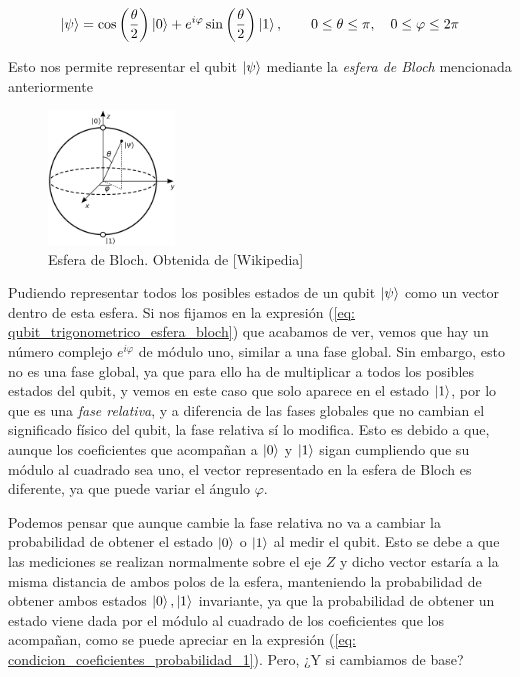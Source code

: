 \documentclass[12pt]{article}
\numberwithin{equation}{section} %
\begin{document}
    \begin{equation}
        \ket{\psi} = \cos \left( \frac{\theta}{2} \right) \ket{0} + e^{i \varphi} \sin \left( \frac{\theta}{2} \right) \ket{1}, \qquad 0 \leq \theta \leq \pi, \quad 0 \leq \varphi \leq 2 \pi
        \label{eq: qubit_trigonometrico_esfera_bloch}
    \end{equation}

    \vspace{2.5mm}

    Esto nos permite representar el qubit \( \ket{\psi} \) mediante la \textit{esfera de Bloch} mencionada anteriormente

    \begin{figure}[H]
        \centering
        \includegraphics[width=0.3\textwidth]{img/Bloch/bloch_sphere.png}
        \caption{Esfera de Bloch. Obtenida de [Wikipedia]}\label{fig: bloch_sphere}
    \end{figure}

    Pudiendo representar todos los posibles estados de un qubit \( \ket{\psi} \) como un vector dentro de esta esfera. 
    Si nos fijamos en la expresión (\ref{eq: qubit_trigonometrico_esfera_bloch}) que acabamos de ver, vemos que hay un número complejo \( e^{i \varphi} \) de módulo uno, similar a una fase global. Sin embargo, esto no es una fase global, ya que para ello ha de multiplicar a todos los posibles estados del qubit, y vemos en este caso que solo aparece en el estado \( \ket{1} \), por lo que es una \textit{fase relativa}, y a diferencia de las fases globales que no cambian el significado físico del qubit, la fase relativa sí lo modifica. Esto es debido a que, aunque los coeficientes que acompañan a \( \ket{0} \) y \( \ket{1} \) sigan cumpliendo que su módulo al cuadrado sea uno, el vector representado en la esfera de Bloch es diferente, ya que puede variar el ángulo \( \varphi \).

    \vspace{5mm}

    Podemos pensar que aunque cambie la fase relativa no va a cambiar la probabilidad de obtener el estado \( \ket{0} \) o \( \ket{1} \) al medir el qubit. Esto se debe a que las mediciones se realizan normalmente sobre el eje \( Z \) y dicho vector estaría a la misma distancia de ambos polos de la esfera, manteniendo la probabilidad de obtener ambos estados \( \ket{0}, \ket{1} \) invariante, ya que la probabilidad de obtener un estado viene dada por el módulo al cuadrado de los coeficientes que los acompañan, como se puede apreciar en la expresión (\ref{eq: condicion_coeficientes_probabilidad_1}). Pero, ¿Y si cambiamos de base?
    
\end{document}
